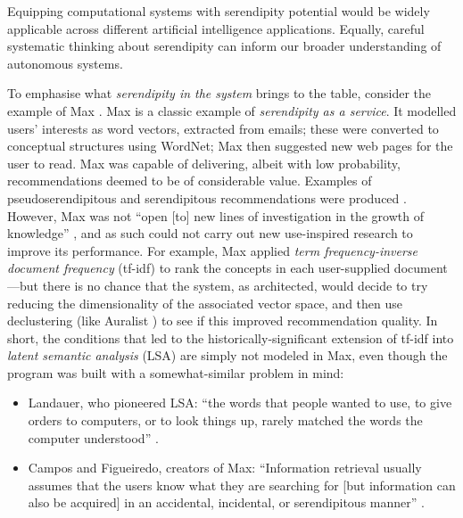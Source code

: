 
Equipping computational systems with serendipity potential would be
widely applicable across different artificial intelligence
applications.  Equally, careful systematic thinking about serendipity
can inform our broader understanding of autonomous systems.

To emphasise what \emph{serendipity in the system} brings to the table, consider the example of {\sf Max}
\cite{Figueiredo2001,campos2001searching}.  {\sf Max} is a classic example
of \emph{serendipity as a service}.  It modelled users'
interests as word vectors, extracted from emails; these were converted
to conceptual structures using WordNet; {\sf Max} then suggested new
web pages for the user to read.  {\sf Max} was capable of delivering,
albeit with low probability, recommendations deemed to be of
considerable value.  Examples of pseudoserendipitous and serendipitous
recommendations were produced \cite[p.~59]{Figueiredo2001}.
However, {\sf Max} was not ``open [to] new lines of
investigation in the growth of knowledge''
\cite{swanson1997interactive}, and as such could not carry out
new use-inspired research to improve its performance.  For example,
{\sf Max} applied \emph{term frequency-inverse document frequency}
(tf-idf) to rank the concepts in each user-supplied document
\cite[p.~160]{campos2001searching}---but there is no chance that the
system, as architected, would decide to try reducing the dimensionality
of the associated vector space, and then use declustering (like {\sf
  Auralist} \cite{Zhang2011}) to see if this improved recommendation
quality.  In short, the conditions that led to the historically-significant
extension of tf-idf into \emph{latent
  semantic analysis} (LSA) are simply not modeled in {\sf Max}, even
though the program was built with a somewhat-similar problem in mind:
\begin{itemize}
\item Landauer, who pioneered LSA: ``the words that people wanted to
  use, to give orders to computers, or to look things up, rarely
  matched the words the computer understood'' \cite{landauer2003pasteur}.
\item Campos and Figueiredo, creators of {\sf Max}: ``Information retrieval usually
  assumes that the users know what they are searching for [but information can also be acquired] in an accidental, incidental, or
  serendipitous manner'' \cite{campos2001searching}.
\end{itemize}

